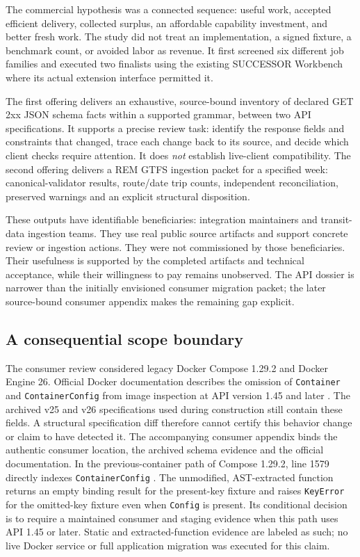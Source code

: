 \documentclass[11pt,letterpaper]{article}
\newcommand{\code}[1]{\texttt{\small #1}}
\begin{document}
The commercial hypothesis was a connected sequence: useful work, accepted efficient delivery,
collected surplus, an affordable capability investment, and better fresh work. The study did not
treat an implementation, a signed fixture, a benchmark count, or avoided labor as revenue. It
first screened six different job families and executed two finalists using the existing
SUCCESSOR Workbench where its actual extension interface permitted it.

The first offering delivers an exhaustive, source-bound inventory of declared GET 2xx JSON
schema facts within a supported grammar, between two API specifications. It supports a precise review task:
identify the response fields and constraints that changed, trace each change back to its source,
and decide which client checks require attention. It does \emph{not} establish live-client
compatibility. The second offering delivers a REM GTFS ingestion packet for a specified week:
canonical-validator results, route/date trip counts, independent reconciliation, preserved
warnings and an explicit structural disposition.

These outputs have identifiable beneficiaries: integration maintainers and transit-data
ingestion teams. They use real public source artifacts and support concrete review or ingestion
actions. They were not commissioned by those beneficiaries. Their usefulness is supported by
the completed artifacts and technical acceptance, while their willingness to pay remains
unobserved. The API dossier is narrower than the initially envisioned consumer migration packet;
the later source-bound consumer appendix makes the remaining gap explicit.



\subsection{A consequential scope boundary}

The consumer review considered legacy Docker Compose 1.29.2 and Docker Engine 26. Official
Docker documentation describes the omission of \code{Container} and \code{ContainerConfig}
from image inspection at API version 1.45 and later \cite{docker-deprecation}. The archived
v25 and v26 specifications used during construction still contain these fields. A structural
specification diff therefore cannot certify this behavior change or claim to have detected it.
The accompanying consumer appendix binds the authentic consumer location, the archived schema
evidence and the official documentation. In the previous-container path of Compose 1.29.2,
line 1579 directly indexes \code{ContainerConfig} \cite{compose-source}. The unmodified,
AST-extracted function returns an empty binding result for the present-key fixture and raises
\code{KeyError} for the omitted-key fixture even when \code{Config} is present. Its conditional
decision is to require a maintained consumer and staging evidence when this path uses API 1.45
or later. Static and extracted-function evidence are labeled as such; no live Docker service
or full application migration was executed for this claim.
\end{document}
